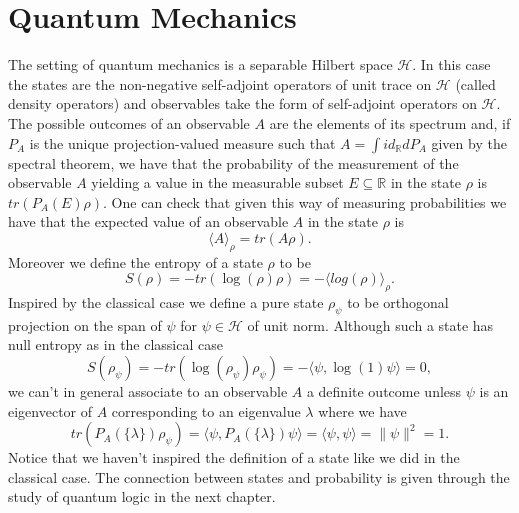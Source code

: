 \section{Quantum Mechanics}\label{sec:QM}

The setting of quantum mechanics is a separable Hilbert space $\mathcal{H}$. In this case the states are the non-negative self-adjoint operators of unit trace on $\mathcal{H}$ (called density operators) and observables take the form of self-adjoint operators on $\mathcal{H}$. The possible outcomes of an observable $A$ are the elements of its spectrum and, if $P_A$ is the unique projection-valued measure such that $A=\int id_\mathbb{R}dP_A$ given by the spectral theorem, we have that the probability of the measurement of the observable $A$ yielding a value in the measurable subset $E\subseteq\mathbb{R}$ in the state $\rho$ is $tr(P_A(E)\rho)$. One can check that given this way of measuring probabilities we have that the expected value of an observable $A$ in the state $\rho$ is
\begin{equation}\label{eq:quantum_states}
\langle A\rangle_\rho = tr(A\rho).
\end{equation}
Moreover we define the entropy of a state $\rho$ to be
\begin{equation}\label{eq:Q_entropy}
S(\rho)=-tr(\log(\rho)\rho)=-\langle log(\rho)\rangle_\rho.
\end{equation}
Inspired by the classical case we define a pure state $\rho_\psi$ to be orthogonal projection on the span of $\psi$ for $\psi\in\mathcal{H}$ of unit norm. Although such a state has null entropy as in the classical case
\begin{equation}\label{eqn:entropy_pure}
S(\rho_\psi)=-tr(\log(\rho_\psi)\rho_\psi)=-\langle\psi,\log(1)\psi\rangle = 0,
\end{equation} 
we can't in general associate to an observable $A$ a definite outcome unless $\psi$ is an eigenvector of $A$ corresponding to an eigenvalue $\lambda$ where we have 
\begin{equation}
tr(P_A(\{\lambda\})\rho_\psi)=\langle\psi,P_A(\{\lambda\})\psi\rangle=\langle\psi,\psi\rangle=\|\psi\|^2=1. 
\end{equation}
Notice that we haven't inspired the definition of a state like we did in the classical case. The connection between states and probability is given through the study of quantum logic in the next chapter.